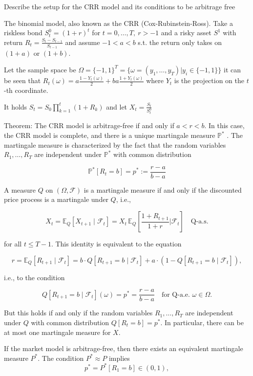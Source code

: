 Describe the setup for the CRR model
and its conditions to be arbitrage free

The binomial model, also known as the CRR (Cox-Rubinstein-Ross).
Take a riskless bond  \( S^0_t = (1 + r)^t \) for \( t = 0, \dots, T,\ r > -1 \)
and a risky asset \( S^1 \) with return \( R_t = \frac{S_t - S_{t-1}}{S_{t-1}} \)
and assume \( -1 < a < b \) s.t. the return only takes on \( (1 + a) \) or \( (1 + b) \).

Let the sample space be \( \Omega = \{-1, 1\}^T = \{\omega = (y_1, \dots, y_T) | y_i \in \{-1, 1\}\} \)
it can be seen that \( R_t(\omega) = a\frac{1 - Y_t(\omega)}{2} + b a\frac{1 + Y_t(\omega)}{2} \) where \( Y_t \)
is the projection on the \( t \)-th coordinate.

It holds
\( S_t = S_0 \prod_{k=1}^t (1 + R_k) \) and let \( X_t = \frac{S_t}{S^0_t} \)

Theorem:
The CRR model is arbitrage-free if and only if \( a < r < b \). In this
case, the CRR model is complete, and there is a unique martingale measure \( \mathbb{P}^\ast \) . The
martingale measure is characterized by the fact that the random variables \( R_1, \dots, R_T \) 
are independent under \( \mathbb{P}^\ast \)  with common distribution

\[
    \mathbb{P}^\ast[R_t = b] = p^\ast := \frac{r-a}{b-a}
\]

A measure \(Q\) on \((\Omega, \mathcal{F})\) is a martingale measure if and only if the discounted price process is a martingale under \(Q\), i.e.,

\[
X_t = \mathbb{E}_Q[X_{t+1} \mid \mathcal{F}_t] = X_t \, \mathbb{E}_Q \left[ \frac{1 + R_{t+1}}{1 + r} \bigg| \mathcal{F}_t \right] \quad \text{Q-a.s.}
\]

for all \(t \leq T-1\). This identity is equivalent to the equation

\[
r = \mathbb{E}_Q[R_{t+1} \mid \mathcal{F}_t] = b \cdot Q[R_{t+1} = b \mid \mathcal{F}_t] + a \cdot (1 - Q[R_{t+1} = b \mid \mathcal{F}_t]),
\]

i.e., to the condition

\[
Q[R_{t+1} = b \mid \mathcal{F}_t](\omega) = p^* = \frac{r-a}{b-a} \quad \text{for Q-a.e. } \omega \in \Omega.
\]

But this holds if and only if the random variables \(R_1, \ldots, R_T\) are independent under \(Q\) with common distribution \(Q[R_t = b] = p^*\). In particular, there can be at most one martingale measure for \(X\).


If the market model is arbitrage-free, then there exists an equivalent martingale measure \(P^*\). 
The condition \(P^* \approx P\) implies
\[
p^* = P^*[R_1 = b] \in (0, 1),
\]

